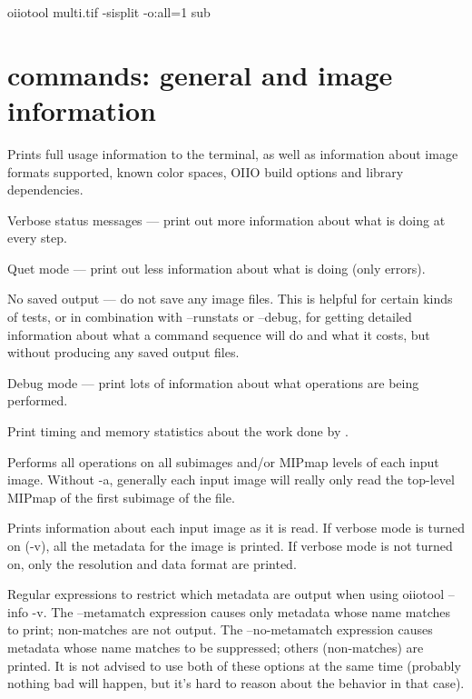 \begin{code}
    oiiotool multi.tif -sisplit -o:all=1 sub%
\end{code}


\newpage
\section{\oiiotool commands: general and image information}

Prints full usage information to the terminal, as well as information
about image formats supported, known color spaces, OIIO build options
and library dependencies.
\apiend

Verbose status messages --- print out more information about what
\oiiotool is doing at every step.
\apiend

Quet mode --- print out less information about what \oiiotool is doing
(only errors).
\apiend

No saved output --- do not save any image files. This is helpful for certain
kinds of tests, or in combination with {\cf --runstats} or {\cf --debug},
for getting detailed information about what a command sequence will do and
what it costs, but without producing any saved output files.
\apiend

Debug mode --- print lots of information about what operations are being
performed.
\apiend

Print timing and memory statistics about the work done by \oiiotool.
\apiend

Performs all operations on all subimages and/or MIPmap levels of each
input image.  Without {\cf -a}, generally each input image will really
only read the top-level MIPmap of the first subimage of the file.
\apiend

Prints information about each input image as it is read.  If verbose mode
is turned on ({\cf -v}), all the metadata for the image is printed.
If verbose mode is not turned on, only the resolution and data format
are printed.
\apiend

Regular expressions to restrict which metadata are output when using
{\cf oiiotool --info -v}.  The {\cf --metamatch} expression causes only
metadata whose name matches to print; non-matches are not output.  The
{\cf --no-metamatch} expression causes metadata whose name matches to be
suppressed; others (non-matches) are printed.  It is not advised to use
both of these options at the same time (probably nothing bad will
happen, but it's hard to reason about the behavior in that case).
\apiend


